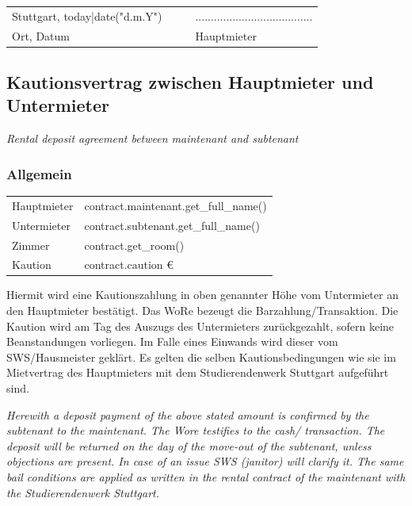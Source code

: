 \documentclass[9pt,pdftex,a4paper]{article}
\newcommand{\signLine}{......................................}
\begin{document}
{{{{%

\vfill

\begin{tabularx}{\textwidth}{@{}YYYY@{}}
Stuttgart, {{ today|date("d.m.Y") }} &  &  & \signLine\\
Ort, Datum &  &  & Hauptmieter\\
\end{tabularx}

%
%

{%

\newpage

\subsection*{Kautionsvertrag zwischen Hauptmieter und Untermieter}
\textit{Rental deposit agreement between maintenant and subtenant}

\subsubsection*{Allgemein}
\begin{tabularx}{\textwidth}{XX}
Hauptmieter & {{ contract.maintenant.get_full_name() }}\\
Untermieter &  {{ contract.subtenant.get_full_name() }}\\
Zimmer & {{ contract.get_room() }}\\
Kaution & {{ contract.caution }}€\\
\end{tabularx}\bigskip

Hiermit wird eine Kautionszahlung in oben genannter Höhe vom Untermieter an den Hauptmieter bestätigt.
Das WoRe bezeugt die Barzahlung/Transaktion.
Die Kaution wird am Tag des Auszugs des Untermieters zurückgezahlt, sofern keine Beanstandungen vorliegen.
Im Falle eines Einwands wird dieser vom SWS/Hausmeister geklärt.
Es gelten die selben Kautionsbedingungen wie sie im Mietvertrag des Hauptmieters mit dem Studierendenwerk Stuttgart aufgeführt sind.\bigskip

\textit{Herewith a deposit payment of the above stated amount is confirmed by the subtenant to the maintenant.
The Wore testifies to the cash/ transaction.
The deposit will be returned on the day of the move-out of the  subtenant, unless objections are present.
In case of an issue SWS (janitor) will clarify it.
The same bail conditions are applied as written in the rental contract of the maintenant with the Studierendenwerk Stuttgart.}

}}}}}
\end{document}
